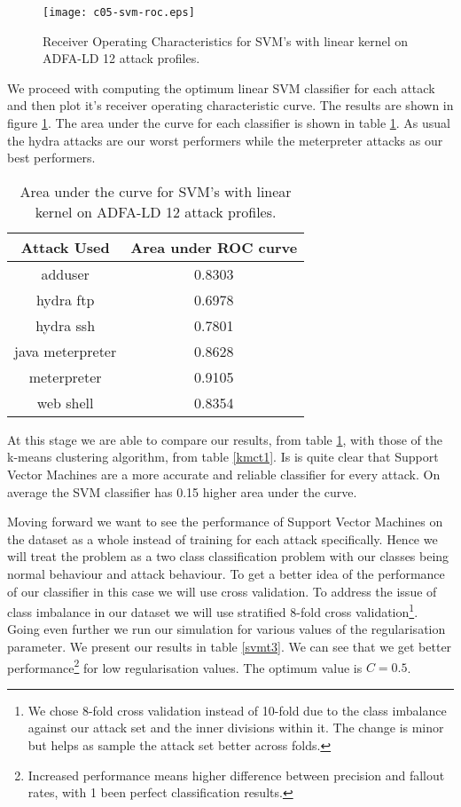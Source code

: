 \documentclass[reqno,openany,12pt]{amsbook}
\begin{document}
\begin{figure}
\texttt{[image: c05-svm-roc.eps]}
\caption{Receiver Operating Characteristics for SVM's with linear kernel on ADFA-LD 12 attack profiles.}
\label{svm-fr2}
\end{figure}

We proceed with computing the optimum linear SVM classifier for each attack and then plot it's receiver operating characteristic curve. The results are shown in figure \ref{svm-fr2}. The area under the curve for each classifier is shown in table \ref{svmt2}. As usual the hydra attacks are our worst performers while the meterpreter attacks as our best performers.

\begin{table}
\begin{tabular}{|c|c|}
\hline
Attack Used &  Area under ROC curve \\ \hline 
adduser          & 0.8303 \\ \hline
hydra ftp        & 0.6978 \\ \hline
hydra ssh        & 0.7801 \\ \hline
java meterpreter & 0.8628 \\ \hline
meterpreter      & 0.9105 \\ \hline
web shell        & 0.8354 \\ \hline
\end{tabular}
\vspace{5pt}
\caption{Area under the curve for SVM's with linear kernel on ADFA-LD 12 attack profiles.}
\label{svmt2}
\end{table}


At this stage we are able to compare our results, from table \ref{svmt2}, with those of the k-means clustering algorithm, from table \ref{kmct1}. Is is quite clear that Support Vector Machines are a more accurate and reliable classifier for every attack. On average the SVM classifier has 0.15 higher area under the curve.

Moving forward we want to see the performance of Support Vector Machines on the dataset as a whole instead of training for each attack specifically. Hence we will treat the problem as a two class classification problem with our classes being normal behaviour and attack behaviour. To get a better idea of the performance of our classifier in this case we will use cross validation. To address the issue of class imbalance in our dataset we will use stratified 8-fold cross validation\footnote{We chose 8-fold cross validation instead of 10-fold due to the class imbalance against our attack set and the inner divisions within it. The change is minor but helps as sample the attack set better across folds.}. Going even further we run our simulation for various values of the regularisation parameter. We present our results in table \ref{svmt3}. We can see that we get better performance\footnote{Increased performance means higher difference between precision and fallout rates, with 1 been perfect classification results.} for low regularisation values. The optimum value is $C=0.5$.
\end{document}
